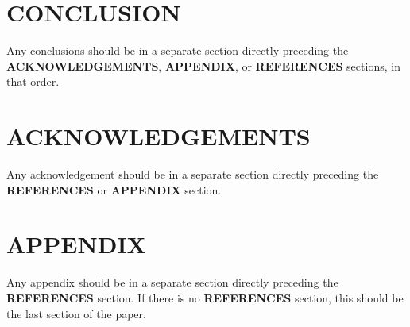 \documentclass[a4paper,
               biblatex,     %
               keeplastbox,   %
               ]{jacow}
\begin{document}
\section{CONCLUSION}

Any conclusions should be in a separate section directly preceding
the \textbf{ACKNOWLEDGEMENTS}, \textbf{APPENDIX}, or \textbf{REFERENCES} sections, in that
order.

\section{ACKNOWLEDGEMENTS}
Any acknowledgement should be in a separate section directly preceding
the \textbf{REFERENCES} or \textbf{APPENDIX} section.


\section{APPENDIX}
Any appendix should be in a separate section directly preceding
the \textbf{REFERENCES} section. If there is no \textbf{REFERENCES} section,
this should be the last section of the paper.

\printbibliography
\end{document}
